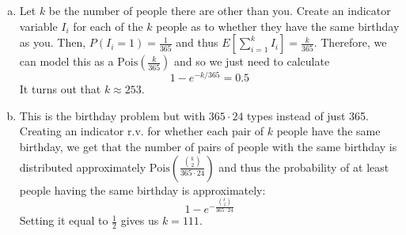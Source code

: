 \documentclass[11.5pt]{article}
\begin{document}
\begin{solution}{3}
\begin{enumerate}[(a)]
\vspace{-1em}
\item Let $k$ be the number of people there are other than you. Create an indicator variable $I_i$ for each of the $k$ people as to whether they have the same birthday as you. Then, $P(I_i = 1) = \frac{1}{365}$ and thus $E\left[ \sum_{i = 1}^{k} I_i \right] = \frac{k}{365}$. Therefore, we can model this as a $\text{Pois} \left( \frac{k}{365} \right)$ and so we just need to calculate 
$$ 1 - e^{-k/365} = 0.5$$ 
It turns out that $k \approx 253$. 
\item This is the birthday problem but with $365 \cdot 24$ types instead of just 365. Creating an indicator r.v. for whether each pair of $k$ people have the same birthday, we get that the number of pairs of people with the same birthday is distributed approximately $\text{Pois} \left( \frac{{k \choose 2}}{365 \cdot 24}  \right)$ and thus the probability of at least people having the same birthday is approximately: 
$$ 1 - e^{-\frac{{k \choose 2}}{365 \cdot 24}}$$
Setting it equal to $\frac{1}{2}$ gives us $k = 111$. 

\end{enumerate}
\end{solution}
\end{document}
